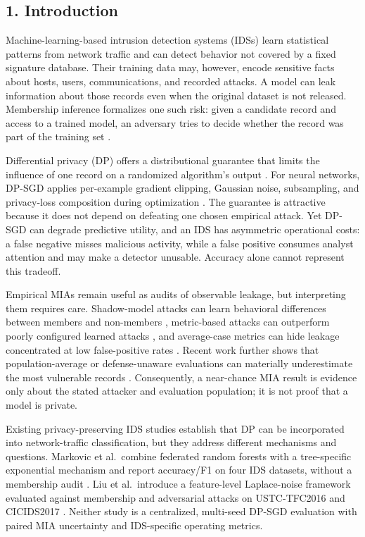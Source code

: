 \documentclass[11pt,a4paper]{article}
\begin{document}
\hypertarget{introduction}{%
\subsection{1. Introduction}\label{introduction}}

Machine-learning-based intrusion detection systems (IDSs) learn
statistical patterns from network traffic and can detect behavior not
covered by a fixed signature database. Their training data may, however,
encode sensitive facts about hosts, users, communications, and recorded
attacks. A model can leak information about those records even when the
original dataset is not released. Membership inference formalizes one
such risk: given a candidate record and access to a trained model, an
adversary tries to decide whether the record was part of the training
set \citep{shokri2017membership}.

Differential privacy (DP) offers a distributional guarantee that limits
the influence of one record on a randomized algorithm's output
\citep{dwork2006calibrating}. For neural networks, DP-SGD applies
per-example gradient clipping, Gaussian noise, subsampling, and
privacy-loss composition during optimization \citep{abadi2016deep}. The
guarantee is attractive because it does not depend on defeating one
chosen empirical attack. Yet DP-SGD can degrade predictive utility, and
an IDS has asymmetric operational costs: a false negative misses
malicious activity, while a false positive consumes analyst attention
and may make a detector unusable. Accuracy alone cannot represent this
tradeoff.

Empirical MIAs remain useful as audits of observable leakage, but
interpreting them requires care. Shadow-model attacks can learn
behavioral differences between members and non-members
\citep{shokri2017membership}, metric-based attacks can outperform poorly
configured learned attacks \citep{song2021systematic}, and average-case
metrics can hide leakage concentrated at low false-positive rates
\citep{carlini2022membership}. Recent work further shows that
population-average or defense-unaware evaluations can materially
underestimate the most vulnerable records \citep{aerni2024evaluations}.
Consequently, a near-chance MIA result is evidence only about the stated
attacker and evaluation population; it is not proof that a model is
private.

Existing privacy-preserving IDS studies establish that DP can be
incorporated into network-traffic classification, but they address
different mechanisms and questions. Markovic et al.~combine federated
random forests with a tree-specific exponential mechanism and report
accuracy/F1 on four IDS datasets, without a membership audit
\citep{markovic2024random}. Liu et al.~introduce a feature-level
Laplace-noise framework evaluated against membership and adversarial
attacks on USTC-TFC2016 and CICIDS2017 \citep{liu2025hierarchical}.
Neither study is a centralized, multi-seed DP-SGD evaluation with paired
MIA uncertainty and IDS-specific operating metrics.
\end{document}
